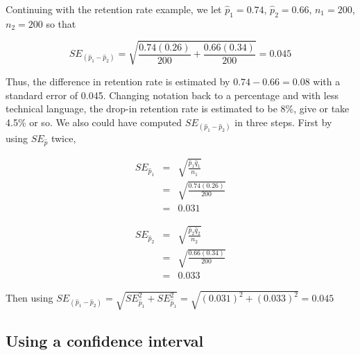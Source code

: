 \documentclass[11pt, chapterprefix=true]{scrbook}\usepackage[]{graphicx}\usepackage[]{color}
\begin{document}

Continuing with the retention rate example, we let $\hat{p}_1 = 0.74$, $\hat{p}_2 = 0.66$, $n_1 = 200$, $n_2 = 200$ so that

$$ SE_{( \hat{p}_1 - \hat{p}_2)} = \sqrt{ \frac{ 0.74 (0.26)}{200} + \frac{ 0.66 (0.34) }{200}} = 0.045 $$

Thus, the difference in retention rate is estimated by $0.74 - 0.66 = 0.08$ with a standard error of 0.045.  Changing notation back to a percentage and with less technical language, the drop-in retention rate is estimated to be 8\%, give or take 4.5\% or so. We also could have computed $ SE_{( \hat{p}_1 - \hat{p}_2)}$  in three steps.  First by using $SE_{\hat{p}}$ twice,

\begin{minipage}[ht]{7cm}

\begin{eqnarray*}
  SE_{\hat{p}_1} &=& \sqrt{ \frac{\hat{p}_1 \hat{q}_1}{n_1}} \\
  &=& \sqrt{ \frac{0.74  (0.26)}{200}} \\
  &=& 0.031
\end{eqnarray*} 

\end{minipage}
\begin{minipage}[ht]{7cm}

\begin{eqnarray*}
  SE_{\hat{p}_2} &=& \sqrt{ \frac{\hat{p}_2 \hat{q}_2}{n_2}} \\ 
  &=& \sqrt{ \frac{0.66  (0.34)}{200}} \\
  &=& 0.033
\end{eqnarray*}  

\end{minipage}

\vspace{1cm}

Then using $ SE_{( \hat{p}_1 - \hat{p}_2)} = \sqrt{ SE_{\hat{p}_1}^2 + SE_{\hat{p}_1}^2} = \sqrt{ (0.031)^2 + (0.033)^2} = 0.045 $

\subsection{Using a confidence interval}
\end{document}
